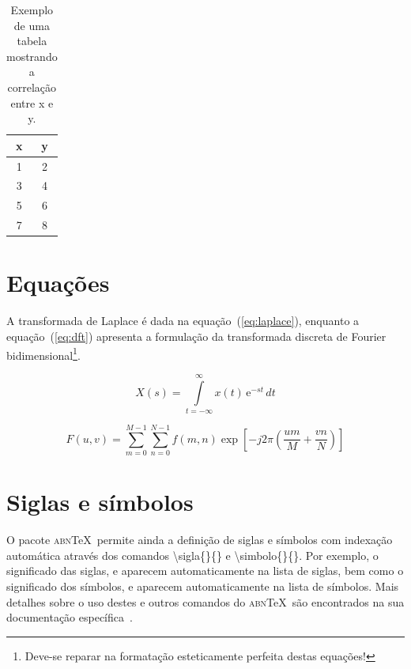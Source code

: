 \begin{table}[!htb]
	\centering
	\caption[Exemplo de uma tabela]{Exemplo de uma tabela mostrando a correla\c{c}\~ao entre x e y.}
	\label{tab:correlacao}
	\begin{tabular}{cc}
		\hline 
		x & y \\
		\hline
		1 & 2 \\
		3 & 4 \\
		5 & 6 \\
		7 & 8 \\
		\hline 
	\end{tabular}
\end{table}

\section{Equa\c{c}\~oes}

A transformada de Laplace \'e dada na equa\c{c}\~ao~(\ref{eq:laplace}), enquanto a equa\c{c}\~ao~(\ref{eq:dft}) apresenta a formula\c{c}\~ao da transformada discreta de Fourier bidimensional\footnote{Deve-se reparar na formata\c{c}\~ao esteticamente perfeita destas equa\c{c}\~oes!}.

\begin{equation}
X(s) = \int\limits_{t = -\infty}^{\infty} x(t) \, \text{e}^{-st} \, dt
\label{eq:laplace}
\end{equation}

\begin{equation}
F(u, v) = \sum_{m = 0}^{M - 1} \sum_{n = 0}^{N - 1} f(m, n) \exp \left[ -j 2 \pi \left( \frac{u m}{M} + \frac{v n}{N} \right) \right]
\label{eq:dft}
\end{equation}

\section{Siglas e s\'imbolos}

O pacote \textsc{abn}\TeX\ permite ainda a defini\c{c}\~ao de siglas e s\'imbolos com indexa\c{c}\~ao autom\'atica atrav\'es dos comandos {\ttfamily \textbackslash sigla\{\}\{\}} e {\ttfamily \textbackslash simbolo\{\}\{\}}. Por exemplo, o significado das siglas, e aparecem automaticamente na lista de siglas, bem como o significado dos s\'imbolos, e aparecem automaticamente na lista de s\'imbolos. Mais detalhes sobre o uso destes e outros comandos do \textsc{abn}\TeX\ s\~ao encontrados na sua documenta\c{c}\~ao espec\'ifica~\cite{abnTeX2009}.



